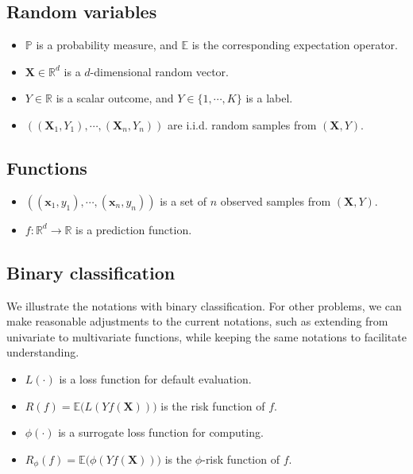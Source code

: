 \documentclass[report]{imsart}
\theoremstyle{plain}
\theoremstyle{definition}
\newcommand{\mbf}[1]{\mathbf{#1}}
\begin{document}
\subsection*{Random variables}
\begin{itemize}
\item $\mathbb{P}$ is a probability measure, and $\mathbb{E}$ is the corresponding expectation operator.
\item $\mbf{X} \in \mathbb{R}^d$ is a $d$-dimensional random vector.
\item $Y \in \mathbb{R}$ is a scalar outcome, and $Y \in \{1, \cdots, K\}$ is a label.
\item $((\mbf{X}_1, Y_1), \cdots, (\mbf{X}_n, Y_n))$ are i.i.d. random samples from $(\mbf{X}, Y)$.
\end{itemize}

\subsection*{Functions}
\begin{itemize}
\item $((\mbf{x}_1, y_1), \cdots, (\mbf{x}_n, y_n))$ is a set of $n$ observed samples from $(\mbf{X}, Y)$.
\item $f: \mathbb{R}^d \rightarrow \mathbb{R}$ is a prediction function.
\end{itemize}

\subsection*{Binary classification} We illustrate the notations with binary classification. For other problems, we can make reasonable adjustments to the current notations, such as extending from univariate to multivariate functions, while keeping the same notations to facilitate understanding.
\begin{itemize}
\item $L(\cdot)$ is a loss function for default evaluation.
\item $R(f) = \mathbb{E}\big(L(Yf(\mbf{X}))\big)$ is the risk function of $f$.
\item $\phi(\cdot)$ is a surrogate loss function for computing.
\item $R_\phi(f) = \mathbb{E}\big(\phi(Yf(\mbf{X}))\big)$ is the $\phi$-risk function of $f$.
\end{itemize}



\end{document}
